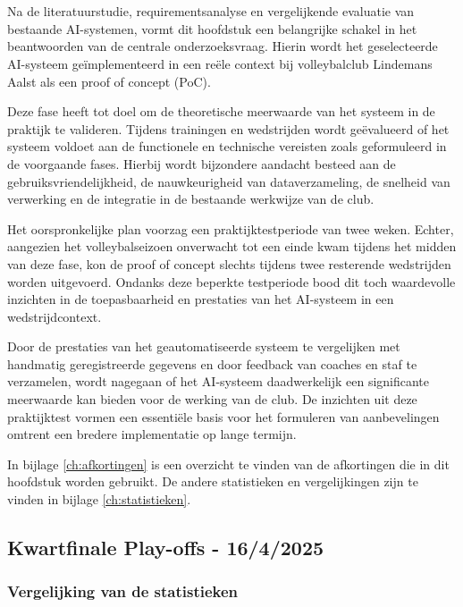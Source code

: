 \chapter{}
\label{ch:poc}
Na de literatuurstudie, requirementsanalyse en vergelijkende evaluatie van bestaande AI-systemen, vormt dit hoofdstuk een belangrijke schakel in het beantwoorden van de centrale onderzoeksvraag. Hierin wordt het geselecteerde AI-systeem geïmplementeerd in een reële context bij volleybalclub Lindemans Aalst als een proof of concept (PoC).

Deze fase heeft tot doel om de theoretische meerwaarde van het systeem in de praktijk te valideren. Tijdens trainingen en wedstrijden wordt geëvalueerd of het systeem voldoet aan de functionele en technische vereisten zoals geformuleerd in de voorgaande fases. Hierbij wordt bijzondere aandacht besteed aan de gebruiksvriendelijkheid, de nauwkeurigheid van dataverzameling, de snelheid van verwerking en de integratie in de bestaande werkwijze van de club.

Het oorspronkelijke plan voorzag een praktijktestperiode van twee weken. Echter, aangezien het volleybalseizoen onverwacht tot een einde kwam tijdens het midden van deze fase, kon de proof of concept slechts tijdens twee resterende wedstrijden worden uitgevoerd. Ondanks deze beperkte testperiode bood dit toch waardevolle inzichten in de toepasbaarheid en prestaties van het AI-systeem in een wedstrijdcontext.

Door de prestaties van het geautomatiseerde systeem te vergelijken met handmatig geregistreerde gegevens en door feedback van coaches en staf te verzamelen, wordt nagegaan of het AI-systeem daadwerkelijk een significante meerwaarde kan bieden voor de werking van de club. De inzichten uit deze praktijktest vormen een essentiële basis voor het formuleren van aanbevelingen omtrent een bredere implementatie op lange termijn.

In bijlage \ref{ch:afkortingen} is een overzicht te vinden van de afkortingen die in dit hoofdstuk worden gebruikt. De andere statistieken en vergelijkingen zijn te vinden in bijlage \ref{ch:statistieken}.

\section{Kwartfinale Play-offs - 16/4/2025}
\subsection{Vergelijking van de statistieken}


